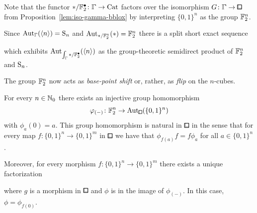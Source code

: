Note that the functor $\ast/\F_2^\bullet\colon\bbGamma\to\Cat$ factors over the isomorphism
$G\colon\bbGamma\to\bblox$ from Proposition~\ref{lem:iso-gamma-bblox} by interpreting $\{0,1\}^n$
as the group $\mathbb{F}_2^n$.

\begin{remark}
Since $\Aut_{\bbGamma}(\langle n\rangle) = \uS_n$ and $\operatorname{Aut}_{\ast/\mathbb{F}_2^n}(\ast) = \mathbb{F}_2^n$
there is a split short exact sequence
\begin{center}
\end{center}
which exhibits $\Aut_{\int_{\bbGamma} \ast/\F_2^\bullet}(\langle n\rangle)$ as the group-theoretic semidirect product of $\mathbb{F}_2^n$ and $\mathrm{S}_n$.
\end{remark}


The group $\mathbb{F}_2^n$ now acts as \emph{base-point shift} or, rather, as \emph{flip} on the $n$-cubes.
\begin{lemma}\label{lem:linearization-auto-bblox}
For every $n\in{\mathbb{N}}_0$ there exists an injective group homomorphism
\[
    \phi_{(-)}\colon\F_2^n\to\Aut_{{\bbox}}(\{0,1\}^n)
\]
with $\phi_a(0) = a$.
This group homomorphism is natural in ${\bblox}$ in the sense that for every map
$f\colon\{0,1\}^n\to\{0,1\}^m$ in ${\bblox}$ we have that $\phi_{f(a)}f = f\phi_a$ for all $a\in\{0,1\}^n$.

Moreover, for every morphism $f\colon\{0,1\}^n\to\{0,1\}^m$ there exists a unique factorization
\begin{center}
\end{center}
where $g$ is a morphism in ${\bblox}$ and $\phi$ is in the image of $\phi_{(-)}$.
In this case, $\phi = \phi_{f(0)}$.
\end{lemma}

